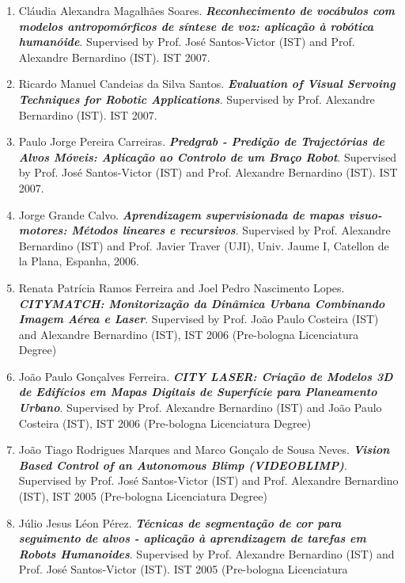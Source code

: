 \documentclass[
]{article}
\begin{document}
\begin{enumerate}
{{  omnidirectional camera and particle filters}}. Supervised by Prof.
  Matteo Matteucci (Politecnico di Milano) and Prof. Alexandre
  Bernardino (IST). Politecnico di Milano 2008.
\item
  Cláudia Alexandra Magalhães Soares. \emph{\textbf{Reconhecimento de
  vocábulos com modelos antropomórficos de síntese de voz: aplicação à
  robótica humanóide}}. Supervised by Prof. José Santos-Victor (IST) and
  Prof. Alexandre Bernardino (IST). IST 2007.
\item
  Ricardo Manuel Candeias da Silva Santos. \emph{\textbf{Evaluation of
  Visual Servoing Techniques for Robotic Applications}}. Supervised by
  Prof. Alexandre Bernardino (IST). IST 2007.
\item
  Paulo Jorge Pereira Carreiras. \emph{\textbf{Predgrab - Predição de
  Trajectórias de Alvos Móveis: Aplicação ao Controlo de um Braço
  Robot}}. Supervised by Prof. José Santos-Victor (IST) and Prof.
  Alexandre Bernardino (IST). IST 2007.
\item
  Jorge Grande Calvo. \emph{\textbf{Aprendizagem supervisionada de mapas
  visuo-motores: Métodos lineares e recursivos}}. Supervised by Prof.
  Alexandre Bernardino (IST) and Prof. Javier Traver (UJI), Univ. Jaume
  I, Catellon de la Plana, Espanha, 2006.
\item
  Renata Patrícia Ramos Ferreira and Joel Pedro Nascimento Lopes.
  \emph{\textbf{CITYMATCH: Monitorização da Dinâmica Urbana Combinando
  Imagem Aérea e Laser}}. Supervised by Prof. João Paulo Costeira (IST)
  and Alexandre Bernardino (IST), IST 2006 (Pre-bologna Licenciatura
  Degree)
\item
  João Paulo Gonçalves Ferreira. \emph{\textbf{CITY LASER: Criação de
  Modelos 3D de Edifícios em Mapas Digitais de Superfície para
  Planeamento Urbano}}. Supervised by Prof. Alexandre Bernardino (IST)
  and João Paulo Costeira (IST), IST 2006 (Pre-bologna Licenciatura
  Degree)
\item
  João Tiago Rodrigues Marques and Marco Gonçalo de Sousa Neves.
  \emph{\textbf{Vision Based Control of an Autonomous Blimp
  (VIDEOBLIMP)}}. Supervised by Prof. José Santos-Victor (IST) and Prof.
  Alexandre Bernardino (IST), IST 2005 (Pre-bologna Licenciatura Degree)
\item
  Júlio Jesus Léon Pérez. \emph{\textbf{Técnicas de segmentação de cor
  para seguimento de alvos - aplicação à aprendizagem de tarefas em
  Robots Humanoides}}. Supervised by Prof. Alexandre Bernardino (IST)
  and Prof. José Santos-Victor (IST). IST 2005 (Pre-bologna Licenciatura

\end{enumerate}
\end{document}

